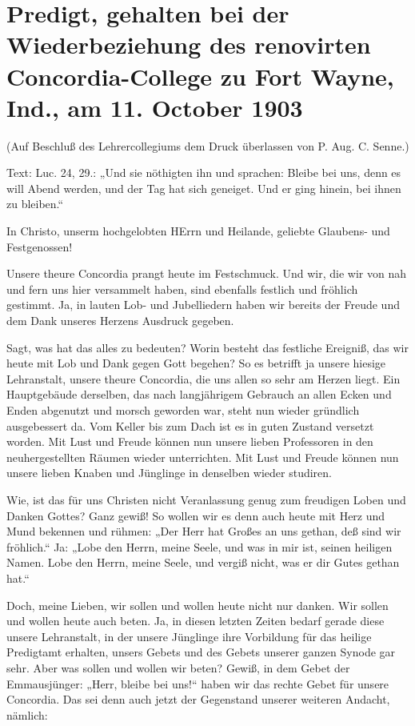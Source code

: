 \chapter[Predigt zur Wiederbeziehung des Concordia-College]{Predigt, gehalten bei der Wiederbeziehung des renovirten Concordia-College zu Fort Wayne, Ind., am 11. October 1903}

\begin{center}
(Auf Beschluß des Lehrercollegiums dem Druck überlassen von P. Aug. C. Senne.)
\end{center}

Text: Luc. 24, 29.: „Und sie nöthigten ihn und sprachen: Bleibe bei uns, denn es will Abend werden, und der Tag hat sich geneiget. Und er ging hinein, bei ihnen zu bleiben.“

In Christo, unserm hochgelobten HErrn und Heilande, geliebte Glaubens- und Festgenossen!

Unsere theure Concordia prangt heute im Festschmuck. Und wir, die wir von nah und fern uns hier versammelt haben, sind ebenfalls festlich und fröhlich gestimmt. Ja, in lauten Lob- und Jubelliedern haben wir bereits der Freude und dem Dank unseres Herzens Ausdruck gegeben.

Sagt, was hat das alles zu bedeuten? Worin besteht das festliche Ereigniß, das wir heute mit Lob und Dank gegen Gott begehen? So es betrifft ja unsere hiesige Lehranstalt, unsere theure Concordia, die uns allen so sehr am Herzen liegt. Ein Hauptgebäude derselben, das nach langjährigem Gebrauch an allen Ecken und Enden abgenutzt und morsch geworden war, steht nun wieder gründlich ausgebessert da. Vom Keller bis zum Dach ist es in guten Zustand versetzt worden. Mit Lust und Freude können nun unsere lieben Professoren in den neuhergestellten Räumen wieder unterrichten. Mit Lust und Freude können nun unsere lieben Knaben und Jünglinge in denselben wieder studiren.

Wie, ist das für uns Christen nicht Veranlassung genug zum freudigen Loben und Danken Gottes? Ganz gewiß! So wollen wir es denn auch heute mit Herz und Mund bekennen und rühmen: „Der Herr hat Großes an uns gethan, deß sind wir fröhlich.“ Ja: „Lobe den Herrn, meine Seele, und was in mir ist, seinen heiligen Namen. Lobe den Herrn, meine Seele, und vergiß nicht, was er dir Gutes gethan hat.“

Doch, meine Lieben, wir sollen und wollen heute nicht nur danken. Wir sollen und wollen heute auch beten. Ja, in diesen letzten Zeiten bedarf gerade diese unsere Lehranstalt, in
der unsere Jünglinge ihre Vorbildung für das heilige Predigtamt erhalten, unsers Gebets und des Gebets unserer ganzen Synode gar sehr. Aber was sollen und wollen wir beten? Gewiß, in dem Gebet der Emmausjünger: „Herr, bleibe bei uns!“ haben wir das rechte Gebet für unsere Concordia. Das sei denn auch jetzt der Gegenstand unserer weiteren Andacht, nämlich:

